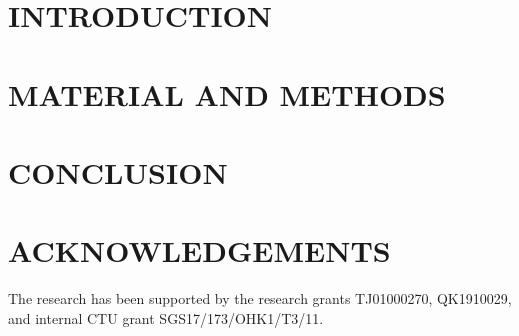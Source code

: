 \documentclass{isprs} %
\begin{document}

\maketitle


\section{INTRODUCTION}\label{INTRODUCTION}
 
\sloppy



\section{MATERIAL AND METHODS}\label{sec:mat_met}







\section{CONCLUSION}



\section*{ACKNOWLEDGEMENTS}\label{ACKNOWLEDGEMENTS}
The research has been supported by the research grants TJ01000270,
QK1910029, and internal CTU grant SGS17/173/OHK1/T3/11.

{
  \begin{spacing}{1.17}
    \normalsize
  \end{spacing}
}

\end{document}
